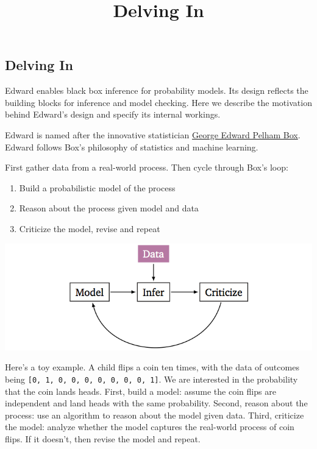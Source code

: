 \title{Delving In}

\subsection{Delving In}

Edward enables black box inference for probability models. Its design reflects
the building blocks for inference and model checking. Here we describe the
motivation behind Edward's design and specify its internal workings.

Edward is named after the innovative statistician
\href{https://en.wikipedia.org/wiki/George_E._P._Box}{George Edward
Pelham Box}. Edward follows Box's philosophy of statistics and machine
learning.

First gather data from a real-world process. Then cycle through Box's
loop:

\begin{enumerate}
\item Build a probabilistic model of the process
\item Reason about the process given model and data
\item Criticize the model, revise and repeat
\end{enumerate}

\hspace*{100px}\includegraphics{images/model_infer_criticize.png}

Here's a toy example. A child flips a coin ten times, with the data of
outcomes being \texttt{{[}0,\ 1,\ 0,\ 0,\ 0,\ 0,\ 0,\ 0,\ 0,\ 1{]}}. We
are interested in the probability that the coin lands heads. First,
build a model: assume the coin flips are independent and land heads with
the same probability. Second, reason about the process: use an algorithm
to reason about the model given data. Third, criticize the model: analyze
whether the model captures the real-world process of coin flips. If it
doesn't, then revise the model and repeat.

